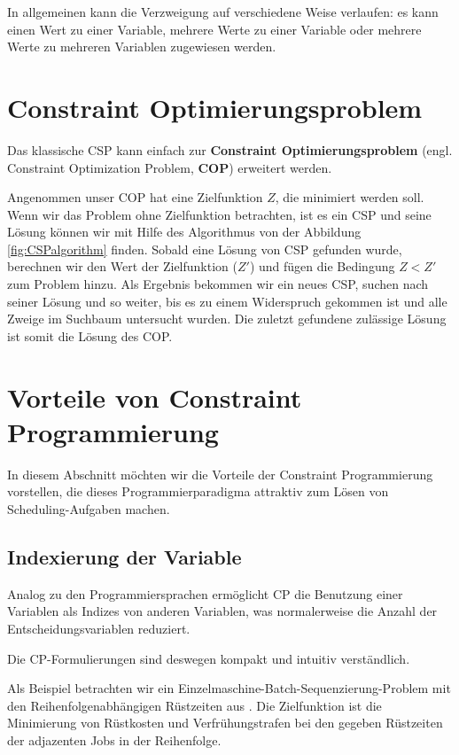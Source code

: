 In allgemeinen kann die Verzweigung auf verschiedene Weise verlaufen: es kann einen Wert zu einer Variable, mehrere Werte zu einer Variable oder mehrere Werte zu mehreren Variablen zugewiesen werden.

\section{Constraint Optimierungsproblem}
Das klassische CSP kann einfach zur {\bf Constraint Optimierungsproblem} (engl. Constraint Optimization Problem, {\bf COP}) erweitert werden. 

Angenommen unser COP hat eine Zielfunktion $Z$, die minimiert werden soll. Wenn wir das Problem ohne Zielfunktion betrachten, ist es ein CSP und seine Lösung können wir mit Hilfe des Algorithmus von der Abbildung \ref{fig:CSPalgorithm} finden. Sobald eine Lösung von CSP gefunden wurde, berechnen wir den Wert der Zielfunktion ($Z'$) und fügen die Bedingung $Z<Z'$ zum Problem hinzu. Als Ergebnis bekommen wir ein neues CSP, suchen nach seiner Lösung und so weiter, bis es zu einem Widerspruch gekommen ist und alle Zweige im Suchbaum untersucht wurden. Die zuletzt gefundene zulässige Lösung  ist somit die Lösung des COP.

\section{Vorteile von Constraint Programmierung}

In diesem Abschnitt möchten wir die Vorteile der Constraint Programmierung vorstellen, die dieses Programmierparadigma attraktiv zum Lösen von Scheduling-Aufgaben  machen.

\subsection {Indexierung der Variable}
Analog zu den Programmiersprachen ermöglicht CP die Benutzung einer Variablen als Indizes von anderen Variablen, was normalerweise die Anzahl der  Entscheidungsvariablen reduziert.

Die CP-Formulierungen sind deswegen kompakt und intuitiv verständlich.

Als Beispiel betrachten wir ein Einzelmaschine-Batch-Sequenzierung-Problem mit den Reihenfolgenabhängigen Rüstzeiten aus \cite{Jordan}. Die Zielfunktion ist die Minimierung von Rüstkosten und Verfrühungstrafen bei den gegeben Rüstzeiten der adjazenten Jobs in der Reihenfolge.

